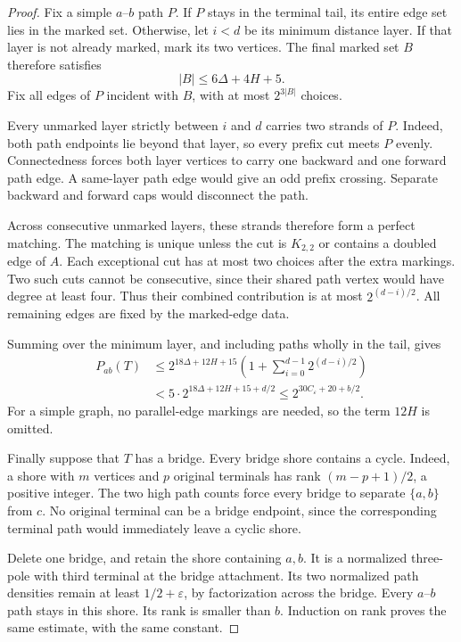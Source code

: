 \begin{proof}
Fix a simple $a$--$b$ path $P$.
If $P$ stays in the terminal tail, its entire edge set lies in the marked set.
Otherwise, let $i<d$ be its minimum distance layer.
If that layer is not already marked, mark its two vertices.
The final marked set $B$ therefore satisfies
\[
 |B|\le6\Delta+4H+5.
\]
Fix all edges of $P$ incident with $B$, with at most $2^{3|B|}$ choices.

Every unmarked layer strictly between $i$ and $d$ carries two strands of $P$.
Indeed, both path endpoints lie beyond that layer, so every prefix cut meets $P$ evenly.
Connectedness forces both layer vertices to carry one backward and one forward path edge.
A same-layer path edge would give an odd prefix crossing.
Separate backward and forward caps would disconnect the path.

Across consecutive unmarked layers, these strands therefore form a perfect matching.
The matching is unique unless the cut is $K_{2,2}$ or contains a doubled edge of $A$.
Each exceptional cut has at most two choices after the extra markings.
Two such cuts cannot be consecutive, since their shared path vertex would have degree at least four.
Thus their combined contribution is at most $2^{(d-i)/2}$.
All remaining edges are fixed by the marked-edge data.

Summing over the minimum layer, and including paths wholly in the tail, gives
\[
 \begin{split}
 P_{ab}(T)
 &\le 2^{18\Delta+12H+15}
       \left(1+\sum_{i=0}^{d-1}2^{(d-i)/2}\right)\\
 &< 5\cdot2^{18\Delta+12H+15+d/2}
 \le 2^{30C_\varepsilon+20+b/2}.
 \end{split}
\]
For a simple graph, no parallel-edge markings are needed, so the term $12H$ is omitted.

Finally suppose that $T$ has a bridge.
Every bridge shore contains a cycle.
Indeed, a shore with $m$ vertices and $p$ original terminals has rank $(m-p+1)/2$, a positive integer.
The two high path counts force every bridge to separate $\{a,b\}$ from $c$.
No original terminal can be a bridge endpoint, since the corresponding terminal path would immediately leave a cyclic shore.

Delete one bridge, and retain the shore containing $a,b$.
It is a normalized three-pole with third terminal at the bridge attachment.
Its two normalized path densities remain at least $1/2+\varepsilon$, by factorization across the bridge.
Every $a$--$b$ path stays in this shore.
Its rank is smaller than $b$.
Induction on rank proves the same estimate, with the same constant.
\end{proof}

